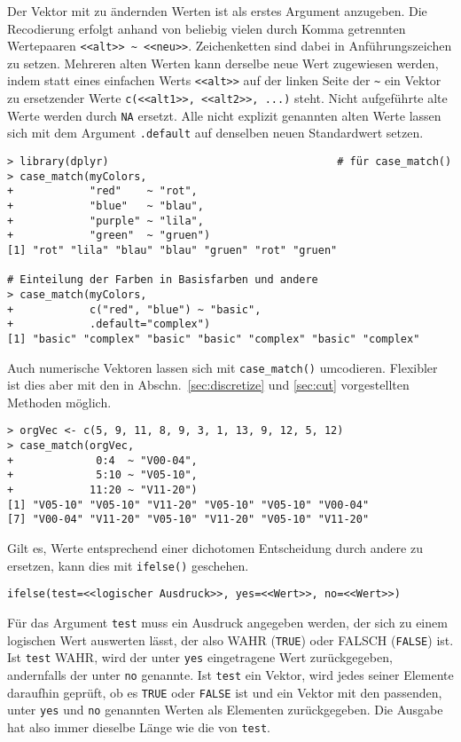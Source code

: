 Der Vektor mit zu ändernden Werten ist als erstes Argument anzugeben. Die Recodierung erfolgt anhand von beliebig vielen durch Komma getrennten Wertepaaren \lstinline!<<alt>> ~ <<neu>>!. Zeichenketten sind dabei in Anführungszeichen zu setzen. Mehreren alten Werten kann derselbe neue Wert zugewiesen werden, indem statt eines einfachen Werts \lstinline!<<alt>>! auf der linken Seite der \lstinline!~! ein Vektor zu ersetzender Werte \lstinline!c(<<alt1>>, <<alt2>>, ...)! steht. Nicht aufgeführte alte Werte werden durch \lstinline!NA! ersetzt. Alle nicht explizit genannten alten Werte lassen sich mit dem Argument \lstinline!.default! auf denselben neuen Standardwert setzen.
\begin{lstlisting}
> library(dplyr)                                    # für case_match()
> case_match(myColors,
+            "red"    ~ "rot",
+            "blue"   ~ "blau",
+            "purple" ~ "lila",
+            "green"  ~ "gruen")
[1] "rot" "lila" "blau" "blau" "gruen" "rot" "gruen" 

# Einteilung der Farben in Basisfarben und andere
> case_match(myColors,
+            c("red", "blue") ~ "basic",
+            .default="complex")
[1] "basic" "complex" "basic" "basic" "complex" "basic" "complex"
\end{lstlisting}

Auch numerische Vektoren lassen sich mit \lstinline!case_match()! umcodieren. Flexibler ist dies aber mit den in Abschn.\ \ref{sec:discretize} und \ref{sec:cut} vorgestellten Methoden möglich.
\begin{lstlisting}
> orgVec <- c(5, 9, 11, 8, 9, 3, 1, 13, 9, 12, 5, 12)
> case_match(orgVec,
+             0:4  ~ "V00-04",
+             5:10 ~ "V05-10",
+            11:20 ~ "V11-20")
[1] "V05-10" "V05-10" "V11-20" "V05-10" "V05-10" "V00-04"
[7] "V00-04" "V11-20" "V05-10" "V11-20" "V05-10" "V11-20"
\end{lstlisting}

Gilt es, Werte entsprechend einer dichotomen Entscheidung durch andere zu ersetzen, kann dies mit \lstinline!ifelse()! geschehen.
\begin{lstlisting}
ifelse(test=<<logischer Ausdruck>>, yes=<<Wert>>, no=<<Wert>>)
\end{lstlisting}

Für das Argument \lstinline!test! muss ein Ausdruck angegeben werden, der sich zu einem logischen Wert auswerten lässt, der also WAHR (\lstinline!TRUE!) oder FALSCH (\lstinline!FALSE!) ist. Ist \lstinline!test! WAHR, wird der unter \lstinline!yes! eingetragene Wert zurückgegeben, andernfalls der unter \lstinline!no! genannte. Ist \lstinline!test! ein Vektor, wird jedes seiner Elemente daraufhin geprüft, ob es \lstinline!TRUE! oder \lstinline!FALSE! ist und ein Vektor mit den passenden, unter \lstinline!yes! und \lstinline!no! genannten Werten als Elementen zurückgegeben. Die Ausgabe hat also immer dieselbe Länge wie die von \lstinline!test!.

